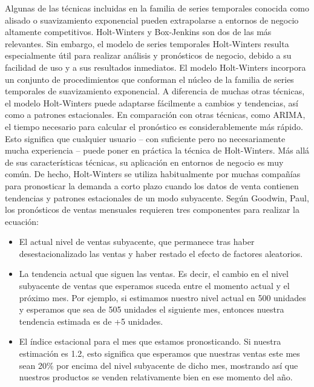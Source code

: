 \noindent
Algunas de las técnicas incluidas en la familia de series temporales conocida como alisado o suavizamiento exponencial pueden extrapolarse a entornos de negocio altamente competitivos. Holt-Winters y Box-Jenkins son dos de las más relevantes. Sin embargo, el modelo de series temporales Holt-Winters resulta especialmente útil para realizar análisis y pronósticos de negocio, debido a su facilidad de uso y a sus resultados inmediatos.
\newline
\newline
El modelo Holt-Winters incorpora un conjunto de procedimientos que conforman el núcleo de la familia de series temporales de suavizamiento exponencial. A diferencia de muchas otras técnicas, el modelo Holt-Winters puede adaptarse fácilmente a cambios y tendencias, así como a patrones estacionales. En comparación con otras técnicas, como ARIMA, el tiempo necesario para calcular el pronóstico es considerablemente más rápido. Esto significa que cualquier usuario – con suficiente pero no necesariamente mucha experiencia – puede poner en práctica la técnica de Holt-Winters. Más allá de sus características técnicas, su aplicación en entornos de negocio es muy común. De hecho, Holt-Winters se utiliza habitualmente por muchas compañías para pronosticar la demanda a corto plazo cuando los datos de venta contienen tendencias y patrones estacionales de un modo subyacente.
\newline
\newline
Según Goodwin, Paul, los pronósticos de ventas mensuales requieren tres componentes para realizar la ecuación:
\begin{itemize}
	\item El actual nivel de ventas subyacente, que permanece tras haber desestacionalizado las ventas y haber restado el efecto de factores aleatorios.
	\item La tendencia actual que siguen las ventas. Es decir, el cambio en el nivel subyacente de ventas que esperamos suceda entre el momento actual y el próximo mes. Por ejemplo, si estimamos nuestro nivel actual en 500 unidades y esperamos que sea de 505 unidades el siguiente mes, entonces nuestra tendencia estimada es de +5 unidades.
	\item El índice estacional para el mes que estamos pronosticando. Si nuestra estimación es 1.2, esto significa que esperamos que nuestras ventas este mes sean 20\% por encima del nivel subyacente de dicho mes, mostrando así que nuestros productos se venden relativamente bien en ese momento del año.
\end{itemize}